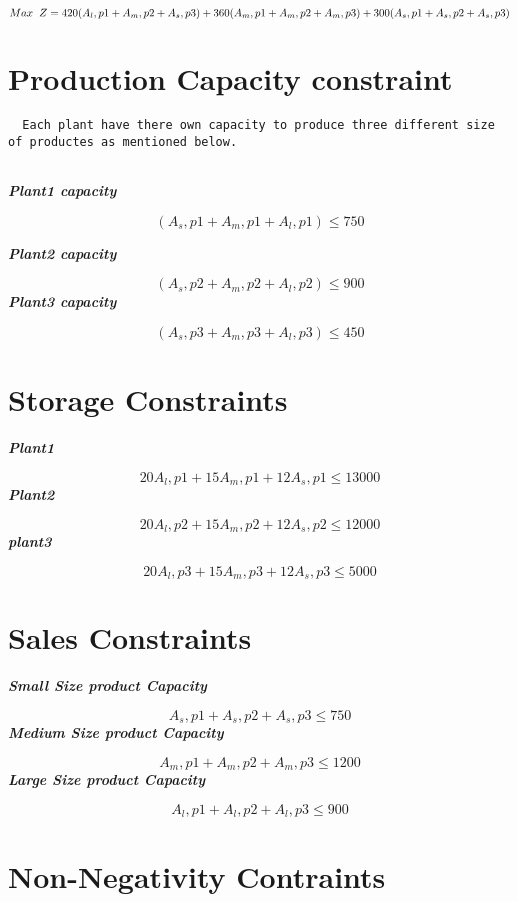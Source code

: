 \documentclass[
]{article}
\begin{document}
\[ Max \hspace{.2cm} Z = 420(A_l,p1+A_m,p2+A_s,p3)+360(A_m,p1+A_m,p2+A_m,p3)+300(A_s,p1+A_s,p2+A_s,p3)\]

\hypertarget{production-capacity-constraint}{%
\section{Production Capacity
constraint}\label{production-capacity-constraint}}

\begin{verbatim}
  Each plant have there own capacity to produce three different size of productes as mentioned below. 
  
\end{verbatim}

\textbf{\emph{Plant1 capacity}}

\[ (A_s,p1+A_m,p1+A_l,p1) \le 750 \]

\textbf{\emph{Plant2 capacity}}

\[ (A_s,p2+A_m,p2+A_l,p2) \le 900 \] \textbf{\emph{Plant3 capacity}}

\[ (A_s,p3+A_m,p3+A_l,p3) \le 450 \]

\hypertarget{storage-constraints}{%
\section{Storage Constraints}\label{storage-constraints}}

\textbf{\emph{Plant1}}

\[ 20A_l,p1+15A_m,p1+12A_s,p1 \le 13000 \] \textbf{\emph{Plant2}}

\[ 20A_l,p2+15A_m,p2+12A_s,p2 \le 12000 \] \textbf{\emph{plant3}}

\[ 20A_l,p3+15A_m,p3+12A_s,p3 \le 5000 \]

\hypertarget{sales-constraints}{%
\section{Sales Constraints}\label{sales-constraints}}

\textbf{\emph{Small Size product Capacity}}

\[A_s,p1+A_s,p2+A_s,p3 \le 750 \] \textbf{\emph{Medium Size product
Capacity}}

\[A_m,p1+A_m,p2+A_m,p3 \le 1200 \] \textbf{\emph{Large Size product
Capacity}}

\[A_l,p1+A_l,p2+A_l,p3 \le 900 \]

\hypertarget{non-negativity-contraints}{%
\section{Non-Negativity Contraints}\label{non-negativity-contraints}}
\end{document}
